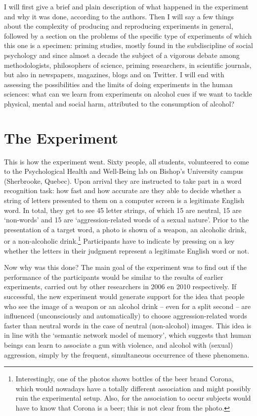 \documentclass[twocolumn, serif, review, authordate]{jote-article}
\begin{document}
I will first give a brief and plain description of what happened in the experiment and why it was done, according to the authors. Then I will say a few things about the complexity of producing and reproducing experiments in general, followed by a section on the problems of the specific type of experiments of which this one is a specimen: priming studies, mostly found in the subdiscipline of social psychology and since almost a decade the subject of a vigorous debate among methodologists, philosophers of science, priming researchers, in scientific journals, but also in newspapers, magazines, blogs and on Twitter. I will end with assessing the possibilities and the limits of doing experiments in the human sciences: what can we learn from experiments on alcohol cues if we want to tackle physical, mental and social harm, attributed to the consumption of alcohol?

{}
\section*{The Experiment}
\gotoreview
\label{sec:experiment}
\noindent This is how the experiment went. Sixty people, all students, volunteered to come to the Psychological Health and Well-Being lab on Bishop's University campus (Sherbrooke, Quebec). Upon arrival they are instructed to take part in a word recognition task: how fast and how accurate are they able to decide whether a string of letters presented to them on a computer screen is a legitimate English word. In total, they get to see 45 letter strings, of which 15 are neutral, 15 are `non-words' and 15 are `aggression-related words of a sexual nature'. Prior to the presentation of a target word, a photo is shown of a weapon, an alcoholic drink, or a non-alcoholic drink.\footnote{ Interestingly, one of the photos shows bottles of the beer brand Corona, which would nowadays have a totally different association and might possibly ruin the experimental setup. Also, for the association to occur subjects would have to know that Corona is a beer; this is not clear from the photo.} Participants have to indicate by pressing on a key whether the letters in their judgment represent a legitimate English word or not.

Now why was this done? The main goal of the experiment was to find out if the performance of the participants would be similar to the results of earlier experiments, carried out by other researchers in 2006 en 2010 respectively. If successful, the new experiment would generate support for the idea that people who see the image of a weapon or an alcohol drink -- even for a split second -- are influenced (unconsciously and automatically) to choose aggression-related words faster than neutral words in the case of neutral (non-alcohol) images. This idea is in line with the `semantic network model of memory', which suggests that human beings can learn to associate a gun with violence, and alcohol with (sexual) aggression, simply by the frequent, simultaneous occurrence of these phenomena.
\end{document}
